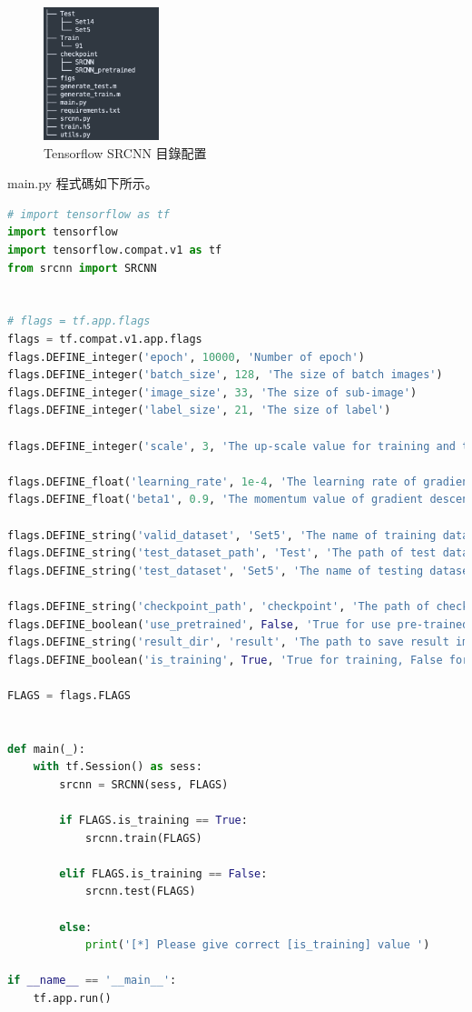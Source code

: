 \documentclass[11pt,UTF8]{ctexart}
\begin{document}
\begin{figure}[H]
\centering 
\includegraphics[width=0.30\textwidth]{tf1.png} 
\caption{Tensorflow SRCNN 目錄配置}
\label{Test}
\end{figure}

main.py 程式碼如下所示。

	\begin{lstlisting}[language={python}]
# import tensorflow as tf
import tensorflow
import tensorflow.compat.v1 as tf
from srcnn import SRCNN


# flags = tf.app.flags
flags = tf.compat.v1.app.flags
flags.DEFINE_integer('epoch', 10000, 'Number of epoch')
flags.DEFINE_integer('batch_size', 128, 'The size of batch images')
flags.DEFINE_integer('image_size', 33, 'The size of sub-image')
flags.DEFINE_integer('label_size', 21, 'The size of label')

flags.DEFINE_integer('scale', 3, 'The up-scale value for training and testing')

flags.DEFINE_float('learning_rate', 1e-4, 'The learning rate of gradient descent algorithm')
flags.DEFINE_float('beta1', 0.9, 'The momentum value of gradient descent algorithm')

flags.DEFINE_string('valid_dataset', 'Set5', 'The name of training dataset')
flags.DEFINE_string('test_dataset_path', 'Test', 'The path of test dataset')
flags.DEFINE_string('test_dataset', 'Set5', 'The name of testing dataset')

flags.DEFINE_string('checkpoint_path', 'checkpoint', 'The path of checkpoint directory')
flags.DEFINE_boolean('use_pretrained', False, 'True for use pre-trained model, False for train on your own')
flags.DEFINE_string('result_dir', 'result', 'The path to save result images')
flags.DEFINE_boolean('is_training', True, 'True for training, False for testing')

FLAGS = flags.FLAGS


def main(_):
    with tf.Session() as sess:
        srcnn = SRCNN(sess, FLAGS)

        if FLAGS.is_training == True:
            srcnn.train(FLAGS)

        elif FLAGS.is_training == False:
            srcnn.test(FLAGS)

        else:
            print('[*] Please give correct [is_training] value ')

if __name__ == '__main__':
    tf.app.run()
	\end{lstlisting}
\end{document}
